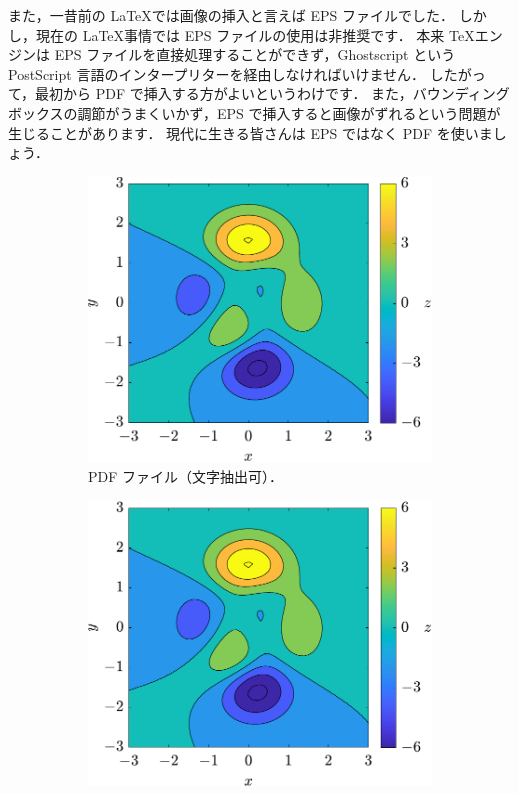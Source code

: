 また，一昔前の \LaTeX では画像の挿入と言えば EPS ファイルでした．
しかし，現在の \LaTeX 事情では EPS ファイルの使用は非推奨です．
本来 \TeX エンジンは EPS ファイルを直接処理することができず，Ghostscript という PostScript 言語のインタープリターを経由しなければいけません．
したがって，最初から PDF で挿入する方がよいというわけです．
また，バウンディングボックスの調節がうまくいかず，EPS で挿入すると画像がずれるという問題が生じることがあります．
現代に生きる皆さんは EPS ではなく PDF を使いましょう．



\begin{figure}[tp]
    \centering
    \begin{subfigure}{0.45\columnwidth}
        \centering
        \includegraphics[width=\columnwidth]{figure/test1.pdf}
        \caption{PDF ファイル（文字抽出可）．}
        \label{subfig:figcomp_pdf}
    \end{subfigure}
    \hfill %
    \begin{subfigure}{0.45\columnwidth}
        \centering
        \includegraphics[width=\columnwidth]{figure/test2.pdf}

\end{subfigure}
\end{figure}
